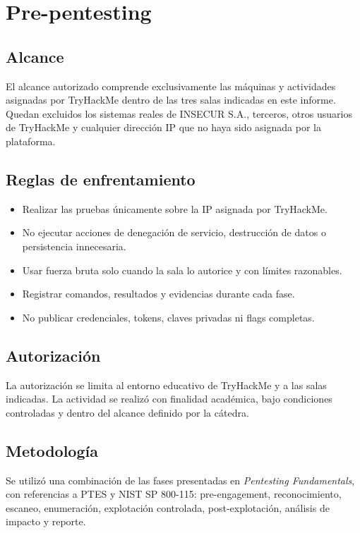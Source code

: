 \documentclass[11pt,a4paper]{article}
\begin{document}
\section{Pre-pentesting}

\subsection{Alcance}
El alcance autorizado comprende exclusivamente las máquinas y actividades asignadas por TryHackMe dentro de las tres salas indicadas en este informe. Quedan excluidos los sistemas reales de INSECUR S.A., terceros, otros usuarios de TryHackMe y cualquier dirección IP que no haya sido asignada por la plataforma.

\subsection{Reglas de enfrentamiento}
\begin{itemize}[leftmargin=*]
  \item Realizar las pruebas únicamente sobre la IP asignada por TryHackMe.
  \item No ejecutar acciones de denegación de servicio, destrucción de datos o persistencia innecesaria.
  \item Usar fuerza bruta solo cuando la sala lo autorice y con límites razonables.
  \item Registrar comandos, resultados y evidencias durante cada fase.
  \item No publicar credenciales, tokens, claves privadas ni flags completas.
\end{itemize}

\subsection{Autorización}
La autorización se limita al entorno educativo de TryHackMe y a las salas indicadas. La actividad se realizó con finalidad académica, bajo condiciones controladas y dentro del alcance definido por la cátedra.

\subsection{Metodología}
Se utilizó una combinación de las fases presentadas en \textit{Pentesting Fundamentals}, con referencias a PTES y NIST SP 800-115: pre-engagement, reconocimiento, escaneo, enumeración, explotación controlada, post-explotación, análisis de impacto y reporte.
\end{document}
